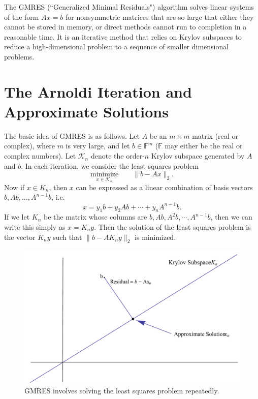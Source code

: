\label{lab:GMRES}

The GMRES (``Generalized Minimal Residuals") algorithm solves linear systems of the form $Ax=b$ for nonsymmetric matrices that are so
large that either they cannot be stored in memory, or direct methods cannot run to completion in a reasonable time.
It is an iterative method that relies on Krylov subspaces to reduce a high-dimensional problem to a sequence of smaller dimensional
problems.

\section*{The Arnoldi Iteration and Approximate Solutions}
The basic idea of GMRES is as follows.
Let $A$ be an $m\times m$ matrix (real or complex), where $m$ is very large,
and let $b \in \mathbb{F}^m$ ($\mathbb{F}$ may either be the real or complex numbers).
Let $\mathcal{K}_n$ denote the order-$n$ Krylov subspace generated by $A$ and $b$.
In each iteration, we consider the least squares problem
\begin{equation}
\underset{x \in \mathcal{K}_n}{\text{minimize}}\qquad \|b-Ax\|_2.
\label{eq:GMRES_lstsq1}
\end{equation}
Now if $x \in K_n$, then $x$ can be expressed as a linear combination of basis vectors $b, Ab, \ldots, A^{n-1}b$, i.e.
\[
x = y_1b + y_2Ab + \cdots + y_nA^{n-1}b.
\]
If we let $K_n$ be the matrix whose columns are $b, Ab, A^{2}b, \cdots, A^{n-1}b$, then we can write this simply as
$x = K_n y$.
Then the solution of the least squares problem is the vector $K_{n}y$ such that $\|b-A K_{n}y\|_2$ is minimized.
\begin{figure}
\includegraphics[width=\textwidth]{LeastSquares}
\caption{GMRES involves solving the least squares problem repeatedly.}
\end{figure}

